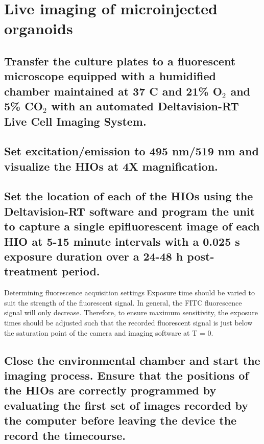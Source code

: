 \documentclass[11pt]{article}
\begin{document}
\section{{\bfseries\sffamily } Live imaging of microinjected organoids}
\label{sec:orgheadline68}
\subsection{{\bfseries\sffamily } Transfer the culture plates to a fluorescent microscope equipped with a humidified chamber maintained at 37 \textdegree{}C and 21\% O\(_{\text{2}}\) and 5\% CO\(_{\text{2}}\) with an automated Deltavision-RT Live Cell Imaging System.}
\label{sec:orgheadline61}

\subsection{{\bfseries\sffamily } Set excitation/emission to 495 nm/519 nm and visualize the HIOs at 4X magnification.}
\label{sec:orgheadline62}
\subsection{{\bfseries\sffamily } Set the location of each of the HIOs using the Deltavision-RT software and program the unit to capture a single epifluorescent image of each HIO at 5-15 minute intervals with a 0.025 s exposure duration over a 24-48 h post-treatment period.}
\label{sec:orgheadline63}
\begin{bclogo}[logo=\bcinfo, couleurBarre=Black, noborder=true, couleur=gray!10]{     Determining fluorescence acquisition settings}
Exposure time should be varied to suit the strength of the fluorescent signal. In general, the FITC fluorescence signal will only decrease. Therefore, to ensure maximum sensitivity, the exposure times should be adjusted such that the recorded fluorescent signal is just below the saturation point of the camera and imaging software at T = 0.\\
\end{bclogo}

\subsection{{\bfseries\sffamily } Close the environmental chamber and start the imaging process. Ensure that the positions of the HIOs are correctly programmed by evaluating the first set of images recorded by the computer before leaving the device the record the timecourse.}
\label{sec:orgheadline65}
\end{document}

